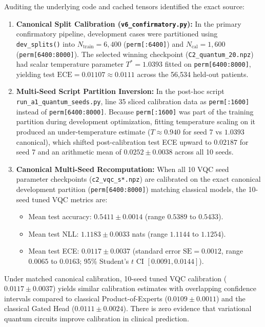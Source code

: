 \documentclass[10pt,a4paper]{article}
\begin{document}
Auditing the underlying code and cached tensors identified the exact source:
\begin{enumerate}
  \item \textbf{Canonical Split Calibration (\texttt{v6\_confirmatory.py}):} In the primary confirmatory pipeline, development cases were partitioned using \texttt{dev\_splits()} into $N_{\text{train}} = 6{,}400$ (\texttt{perm[:6400]}) and $N_{\text{cal}} = 1{,}600$ (\texttt{perm[6400:8000]}). The selected winning checkpoint (\texttt{C2\_quantum\_20.npz}) had scalar temperature parameter $T^* = 1.0393$ fitted on \texttt{perm[6400:8000]}, yielding test $\text{ECE} = 0.01107 \approx 0.0111$ across the 56,534 held-out patients.
  \item \textbf{Multi-Seed Script Partition Inversion:} In the post-hoc script \texttt{run\_a1\_quantum\_seeds.py}, line 35 sliced calibration data as \texttt{perm[:1600]} instead of \texttt{perm[6400:8000]}. Because \texttt{perm[:1600]} was part of the training partition during development optimization, fitting temperature scaling on it produced an under-temperature estimate ($T \approx 0.940$ for seed 7 vs $1.0393$ canonical), which shifted post-calibration test ECE upward to $0.02187$ for seed 7 and an arithmetic mean of $0.0252 \pm 0.0038$ across all 10 seeds.
  \item \textbf{Canonical Multi-Seed Recomputation:} When all 10 VQC seed parameter checkpoints (\texttt{c2\_vqc\_s*.npz}) are calibrated on the exact canonical development partition (\texttt{perm[6400:8000]}) matching classical models, the 10-seed tuned VQC metrics are:
  \begin{itemize}
    \item Mean test accuracy: $0.5411 \pm 0.0014$ (range $0.5389$ to $0.5433$).
    \item Mean test NLL: $1.1183 \pm 0.0033$ nats (range $1.1144$ to $1.1254$).
    \item Mean test ECE: $\mathbf{0.0117 \pm 0.0037}$ (standard error $\text{SE} = 0.0012$, range $0.0065$ to $0.0163$; 95\% Student's $t$ CI $[0.0091, 0.0144]$).
  \end{itemize}
\end{enumerate}
Under matched canonical calibration, 10-seed tuned VQC calibration ($0.0117 \pm 0.0037$) yields similar calibration estimates with overlapping confidence intervals compared to classical Product-of-Experts ($0.0109 \pm 0.0011$) and the classical Gated Head ($0.0111 \pm 0.0024$). There is zero evidence that variational quantum circuits improve calibration in clinical prediction.
\end{document}
